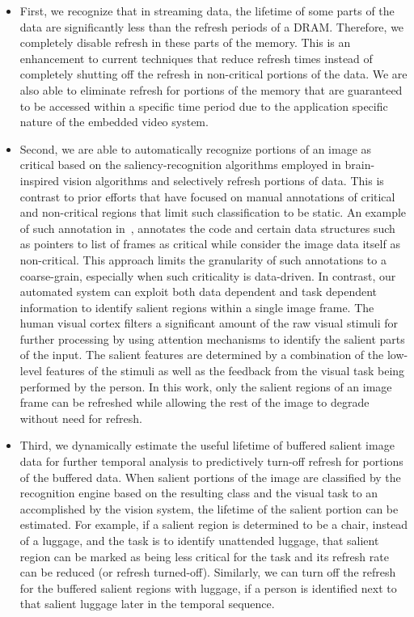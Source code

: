 \begin{itemize}
\item First, we recognize that in streaming data, the lifetime of some parts of the data are significantly less than the refresh periods of a DRAM. Therefore, we completely disable refresh in these parts of the memory. This is an enhancement to current techniques that reduce refresh times instead of completely shutting off the refresh in non-critical portions of the data. We are also able to eliminate refresh for portions of the memory that are guaranteed to be accessed within a specific time period due to the application specific nature of the embedded video system.
\item Second, we are able to automatically recognize portions of an image as critical based on the saliency-recognition algorithms employed in brain-inspired vision algorithms and selectively refresh portions of data. This is contrast to prior efforts that have focused on manual annotations of critical and non-critical regions that limit such classification to be static. An example of such annotation in~\cite{Liu2011}, annotates the code and certain data structures such as pointers to list of frames as critical while consider the image data itself as non-critical. This approach limits the granularity of such annotations to a coarse-grain, especially when such criticality is data-driven. In contrast, our automated system can exploit both data dependent and task dependent information to identify salient regions within a single image frame. 
The human visual cortex filters a significant amount of the raw visual stimuli for further processing by using attention mechanisms to identify the salient parts of the input. The salient features are determined by a combination of the low-level features of the stimuli as well as the feedback from the visual task being performed by the person. In this work, only the salient regions of an image frame can be refreshed while allowing the rest of the image to degrade without need for refresh. 
\item Third, we dynamically estimate the useful lifetime of buffered salient image data for further temporal analysis to predictively turn-off refresh for portions of the buffered data. When salient portions of the image are classified by the recognition engine based on the resulting class and the visual task to an accomplished by the vision system, the lifetime of the salient portion can be estimated. For example, if a salient region is determined to be a chair, instead of a luggage, and the task is to identify unattended luggage, that salient region can be marked as being less critical for the task and its refresh rate can be reduced (or refresh turned-off). Similarly, we can turn off the refresh for the buffered salient regions with luggage, if a person is identified next to that salient luggage later in the temporal sequence. 
\end{itemize}

